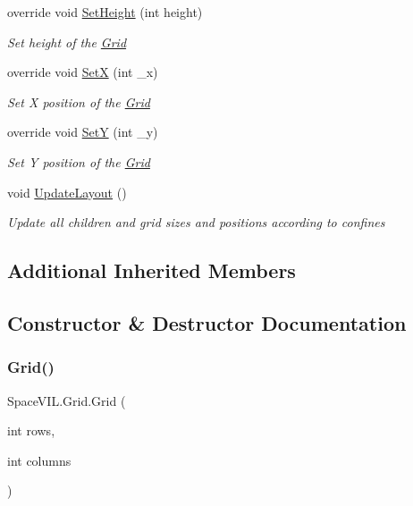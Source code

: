 \begin{DoxyCompactItemize}
override void \mbox{\hyperlink{class_space_v_i_l_1_1_grid_a64c7b1987fb8823330dbeaea7420369c}{Set\+Height}} (int height)
\begin{DoxyCompactList}\small\item\em Set height of the \mbox{\hyperlink{class_space_v_i_l_1_1_grid}{Grid}} \end{DoxyCompactList}\item 
override void \mbox{\hyperlink{class_space_v_i_l_1_1_grid_a28b973b0fddabf73166c9a24946e2e59}{SetX}} (int \+\_\+x)
\begin{DoxyCompactList}\small\item\em Set X position of the \mbox{\hyperlink{class_space_v_i_l_1_1_grid}{Grid}} \end{DoxyCompactList}\item 
override void \mbox{\hyperlink{class_space_v_i_l_1_1_grid_a37ea23fcafda8c5fd8cc8fc41101a20d}{SetY}} (int \+\_\+y)
\begin{DoxyCompactList}\small\item\em Set Y position of the \mbox{\hyperlink{class_space_v_i_l_1_1_grid}{Grid}} \end{DoxyCompactList}\item 
void \mbox{\hyperlink{class_space_v_i_l_1_1_grid_a3cc929016738df7ef25e984338255a55}{Update\+Layout}} ()
\begin{DoxyCompactList}\small\item\em Update all children and grid sizes and positions according to confines \end{DoxyCompactList}\end{DoxyCompactItemize}
\subsection*{Additional Inherited Members}


\subsection{Constructor \& Destructor Documentation}
\mbox{\label{class_space_v_i_l_1_1_grid_a43f2e279b402d3f37abaf7407cb10359}} 
\subsubsection{\texorpdfstring{Grid()}{Grid()}}
{\footnotesize\ttfamily Space\+V\+I\+L.\+Grid.\+Grid (\begin{DoxyParamCaption}\item[{int}]{rows,  }\item[{int}]{columns }\end{DoxyParamCaption})\hspace{0.3cm}{\ttfamily [inline]}}



